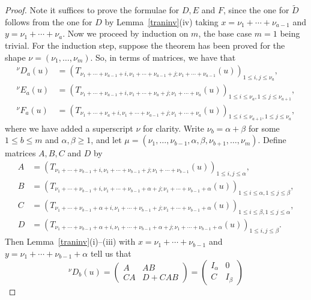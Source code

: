 \documentclass[twoside,12pt,reqno]{amsart}
\begin{document}
\begin{proof}
Note it suffices to prove the formulae for $D, E$ and $F$, since the
one for $\widetilde{D}$ follows from the one for $D$ 
by Lemma~\ref{traninv}(iv) taking $x =\nu_1+\cdots+\nu_{a-1}$
and $y = \nu_1+\cdots+\nu_a$.
Now we proceed by induction on $m$, 
the base case $m=1$ being trivial.
For the induction step, suppose the theorem has been proved for
the shape $\nu = (\nu_1,\dots,\nu_m)$.
So, in terms of matrices, we have that
\begin{align*}
{^\nu}D_{a}(u) &= \left(T_{\nu_1+\cdots+\nu_{a-1}+i,\nu_1+\cdots+\nu_{a-1}+j;
\nu_1+\cdots+\nu_{a-1}}(u)\right)_{1 \leq i,j \leq \nu_a},\\
{^\nu}E_{a}(u) &= \left(T_{\nu_1+\cdots+\nu_{a-1}+i,\nu_1+\cdots+\nu_{a}+j;
\nu_1+\cdots+\nu_{a}}(u)\right)_{1 \leq i \leq \nu_a, 1 \leq j \leq \nu_{a+1}},\\
{^\nu}F_{a}(u) &= \left(T_{\nu_1+\cdots+\nu_{a}+i,\nu_1+\cdots+\nu_{a-1}+j;
\nu_1+\cdots+\nu_{a}}(u)\right)_{1 \leq i \leq \nu_{a+1}, 1 \leq j \leq \nu_{a}},
\end{align*}
where we have added a superscript $\nu$ for clarity.
Write 
$\nu_b = \alpha+\beta$ for some $1 \leq b \leq m$ and 
$\alpha,\beta \geq 1$, and let $\mu = (\nu_1,\dots,\nu_{b-1},\alpha,\beta,
\nu_{b+1},\dots,\nu_m)$.
Define matrices $A,B,C$ and $D$ by
\begin{align*}
A &= \left( T_{\nu_1+\cdots+\nu_{b-1}+i,\nu_1+\cdots+\nu_{b-1}+j;\nu_1+\cdots+\nu_{b-1}}(u)\right)_{1 \leq i,j \leq \alpha},\\
B &= \left( T_{\nu_1+\cdots+\nu_{b-1}+i,\nu_1+\cdots+\nu_{b-1}+\alpha+j;\nu_1+\cdots+\nu_{b-1}+\alpha}(u)\right)_{1 \leq i \leq \alpha, 1 \leq j \leq \beta},\\
C &= \left( T_{\nu_1+\cdots+\nu_{b-1}+\alpha+i,\nu_1+\cdots+\nu_{b-1}+j;\nu_1+\cdots+\nu_{b-1}+\alpha}(u)\right)_{1 \leq i \leq \beta, 1 \leq 
j \leq \alpha},\\
D &= \left( T_{\nu_1+\cdots+\nu_{b-1}+\alpha+i,\nu_1+\cdots+\nu_{b-1}+\alpha+j;\nu_1+\cdots+\nu_{b-1}+\alpha}(u)\right)_{1 \leq i,j \leq \beta}.
\end{align*}
Then Lemma~\ref{traninv}(i)--(iii) with $x = \nu_1+\cdots+\nu_{b-1}$
and $y = \nu_1+\cdots+\nu_{b-1}+\alpha$ tell us that
$$
{^\nu}D_b(u) = 
\left(
\begin{array}{cc}
A&AB\\
CA&D+CAB
\end{array}\right)
=
\left(\begin{array}{ll}I_\alpha&0\\ C&I_\beta\end{array}\right)
$$
\end{proof}
\end{document}
